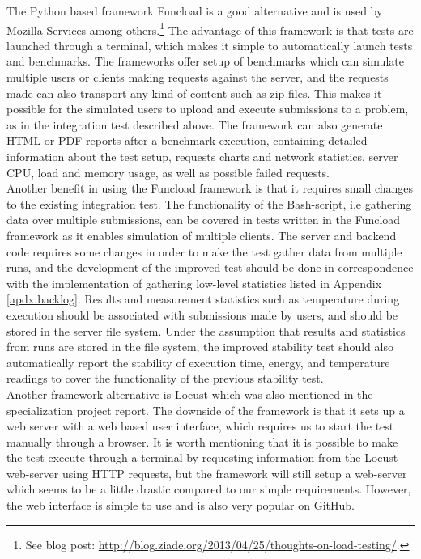 The Python based framework Funcload \cite{FUNCLOAD} is a good alternative and is used by Mozilla Services among others.\footnote{See blog post: \url{http://blog.ziade.org/2013/04/25/thoughts-on-load-testing/}.} The advantage of this framework is that tests are launched through a terminal, which makes it simple to automatically launch tests and benchmarks. The frameworks offer setup of benchmarks which can simulate multiple users or clients making requests against the server, and the requests made can also transport any kind of content such as zip files. This makes it possible for the simulated users to upload and execute submissions to a problem, as in the integration test described above. The framework can also generate HTML or PDF reports after a benchmark execution, containing detailed information about the test setup, requests charts and network statistics, server CPU, load and memory usage, as well as possible failed requests. \\

Another benefit in using the Funcload framework is that it requires small changes to the existing integration test. The functionality of the Bash-script, i.e gathering data over multiple submissions, can be covered in tests written in the Funcload framework as it enables simulation of multiple clients. The server and backend code requires some changes in order to make the test gather data from multiple runs, and the development of the improved test should be done in correspondence with the implementation of gathering low-level statistics listed in Appendix \ref{apdx:backlog}. Results and measurement statistics such as temperature during execution should be associated with submissions made by users, and should be stored in the server file system. Under the assumption that results and statistics from runs are stored in the file system, the improved stability test should also automatically report the stability of execution time, energy, and temperature readings to cover the functionality of the previous stability test. \\

Another framework alternative is Locust \cite{LOCUST} which was also mentioned in the specialization project report. The downside of the framework is that it sets up a web server with a web based user interface, which requires us to start the test manually through a browser. It is worth mentioning that it is possible to make the test execute through a terminal by requesting information from the Locust web-server using HTTP requests, but the framework will still setup a web-server which seems to be a little drastic compared to our simple requirements. However, the web interface is simple to use and is also very popular on GitHub. \\


